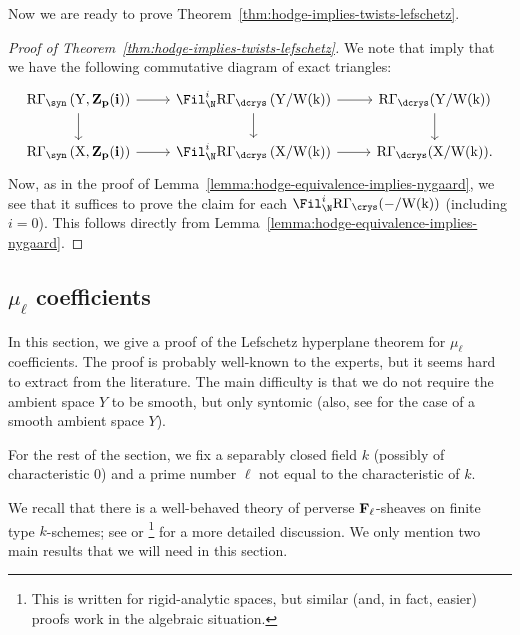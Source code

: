 \documentclass[11pt,reqno]{amsart}
\numberwithin{equation}{section}
\theoremstyle{definition}
\begin{document}
Now we are ready to prove Theorem~\ref{thm:hodge-implies-twists-lefschetz}.

\begin{proof}[Proof of Theorem~\ref{thm:hodge-implies-twists-lefschetz}]
    We note that \cite[Th.~5.6.2 and Var.~7.4.12]{Bhatt-Lurie} imply that we have the following commutative diagram of exact triangles: 
\[
    \begin{tikzcd}
    \rm{R}\Gamma_\syn\left(Y, \bf{Z}_p(i) \right) \arrow{d} \arrow{r} & \Fil_\N^i\rm{R}\Gamma_\dcrys\left(Y/W(k)\right) \arrow{r}{} \arrow{d} & \rm{R}\Gamma_\dcrys(Y/W(k)) \arrow{d} \\
    \rm{R}\Gamma_\syn\left(X, \bf{Z}_p(i) \right) \arrow{r} & \Fil_\N^i\rm{R}\Gamma_\dcrys\left(X/W(k)\right) \arrow{r}{} & \rm{R}\Gamma_\dcrys(X/W(k)).
    \end{tikzcd}
\]
Now, as in the proof of Lemma~\ref{lemma:hodge-equivalence-implies-nygaard}, we see that it suffices to prove the claim for each $\Fil_{\N}^i\rm{R}\Gamma_\crys(-/W(k))$ (including $i=0$). This follows directly from Lemma~\ref{lemma:hodge-equivalence-implies-nygaard}.
\end{proof}





\subsection{$\mu_\ell$ coefficients}\label{section:lefschetz-non-p-part}

In this section, we give a proof of the Lefschetz hyperplane theorem for $\mu_\ell$ coefficients. The proof is probably well-known to the experts, but it seems hard to extract from the literature. The main difficulty is that we do not require the ambient space $Y$ to be smooth, but only syntomic (also, see \cite[Appendix B]{Poonen-Voloch} for the case of a smooth ambient space $Y$).  \smallskip

For the rest of the section, we fix a separably closed field $k$ (possibly of characteristic $0$) and a prime number $\ell$ not equal to the characteristic of $k$. \smallskip

We recall that there is a well-behaved theory of perverse $\bf{F}_\ell$-sheaves on finite type $k$-schemes; see \cite[Intro to Ch.\ 4]{BBD} or \cite[]{Bhatt-Hansen}\footnote{This is written for rigid-analytic spaces, but similar (and, in fact, easier) proofs work in the algebraic situation.} for a more detailed discussion. We only mention two main results that we will need in this section.
\end{document}
